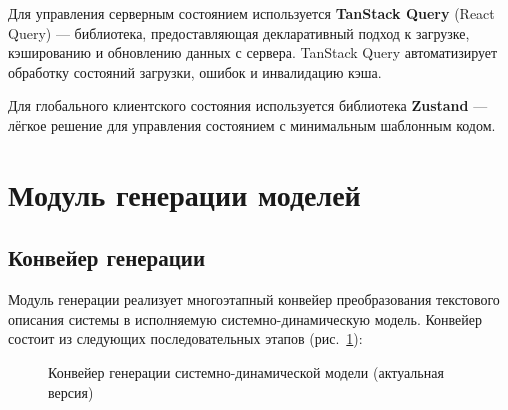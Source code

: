 Для управления серверным состоянием используется \textbf{TanStack Query} (React Query) \cite{tanstack2024} --- библиотека, предоставляющая декларативный подход к загрузке, кэшированию и обновлению данных с сервера. TanStack Query автоматизирует обработку состояний загрузки, ошибок и инвалидацию кэша.

Для глобального клиентского состояния используется библиотека \textbf{Zustand} --- лёгкое решение для управления состоянием с минимальным шаблонным кодом.


\section{Модуль генерации моделей}

\subsection{Конвейер генерации}

Модуль генерации реализует многоэтапный конвейер преобразования текстового описания системы в исполняемую системно-динамическую модель. Конвейер состоит из следующих последовательных этапов (рис.~\ref{fig:pipeline}):

\begin{figure}[H]
    \centering
    \caption{Конвейер генерации системно-динамической модели (актуальная версия)}
    \label{fig:pipeline}
\end{figure}

